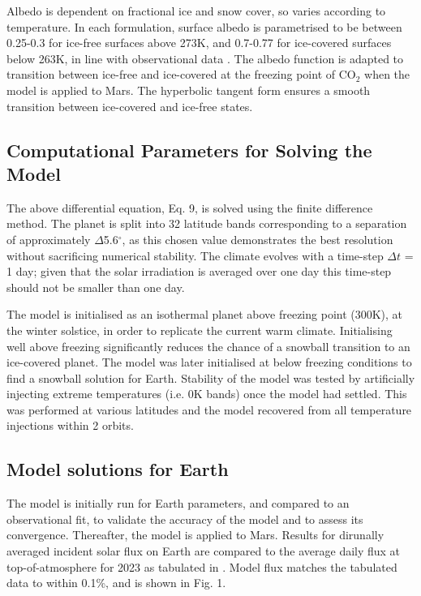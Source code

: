 \documentclass[12pt,onecolumn]{revtex4-2}    %
\begin{document}
Albedo is dependent on fractional ice and snow cover, so varies according to temperature. In each formulation, surface albedo is parametrised to be between 0.25-0.3 for ice-free surfaces above 273K, and 0.7-0.77 for ice-covered surfaces below 263K, in line with observational data \cite{GQ01} \cite{PP12}. The albedo function is adapted to transition between ice-free and ice-covered at the freezing point of $\mathrm{CO_2}$ when the model is applied to Mars. The hyperbolic tangent form ensures a smooth transition between ice-covered and ice-free states.

\subsection{Computational Parameters for Solving the Model}

The above differential equation, Eq. 9, is solved using the finite difference method. The planet is split into 32 latitude bands corresponding to a separation of approximately $\Delta$5.6$^{\circ}$, as this chosen value demonstrates the best resolution without sacrificing numerical stability. The climate evolves with a time-step $\Delta t$ = 1 day; given that the solar irradiation is averaged over one day this time-step should not be smaller than one day.


The model is initialised as an isothermal planet above freezing point (300K), at the winter solstice, in order to replicate the current warm climate. Initialising well above freezing significantly reduces the chance of a snowball transition to an ice-covered planet. The model was later initialised at below freezing conditions to find a snowball solution for Earth. Stability of the model was tested by artificially injecting extreme temperatures (i.e. 0K bands) once the model had settled. This was performed at various latitudes and the model recovered from all temperature injections within 2 orbits. %

\subsection{Model solutions for Earth}
The model is initially run for Earth parameters, and compared to an observational fit, to validate the accuracy of the model and to assess its convergence. Thereafter, the model is applied to Mars. Results for dirunally averaged incident solar flux on Earth are compared to the average daily flux at top-of-atmosphere for 2023 as tabulated in \cite{K23}. Model flux matches the tabulated data to within 0.1\%, and is shown in Fig. 1.
\end{document}

